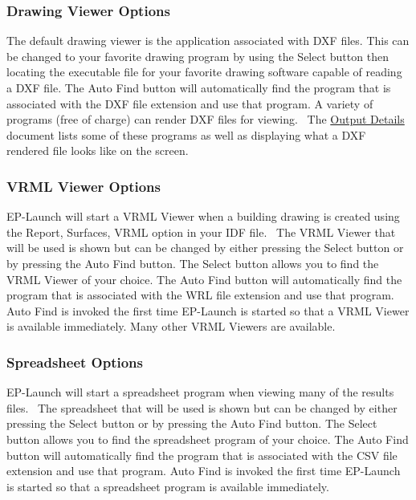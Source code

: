 \subsubsection{Drawing Viewer Options}\label{drawing-viewer-options}

The default drawing viewer is the application associated with DXF files. This can be changed to your favorite drawing program by using the Select button then locating the executable file for your favorite drawing software capable of reading a DXF file. The Auto Find button will automatically find the program that is associated with the DXF file extension and use that program. A variety of programs (free of charge) can render DXF files for viewing.~ The \href{https://energyplus.readthedocs.io/en/latest/guides/output-details-and-examples/index.html}{Output Details} document lists some of these programs as well as displaying what a DXF rendered file looks like on the screen.

\subsubsection{VRML Viewer Options}\label{vrml-viewer-options}

EP-Launch will start a VRML Viewer when a building drawing is created using the Report, Surfaces, VRML option in your IDF file.~ The VRML Viewer that will be used is shown but can be changed by either pressing the Select button or by pressing the Auto Find button. The Select button allows you to find the VRML Viewer of your choice. The Auto Find button will automatically find the program that is associated with the WRL file extension and use that program. Auto Find is invoked the first time EP-Launch is started so that a VRML Viewer is available immediately. Many other VRML Viewers are available.

\subsubsection{Spreadsheet Options}\label{spreadsheet-options}

EP-Launch will start a spreadsheet program when viewing many of the results files.~ The spreadsheet that will be used is shown but can be changed by either pressing the Select button or by pressing the Auto Find button. The Select button allows you to find the spreadsheet program of your choice. The Auto Find button will automatically find the program that is associated with the CSV file extension and use that program. Auto Find is invoked the first time EP-Launch is started so that a spreadsheet program is available immediately.

